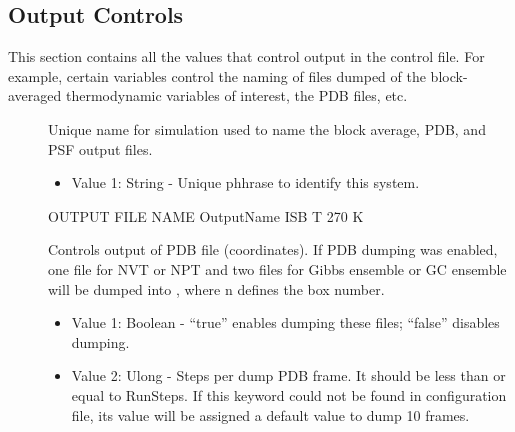 \documentclass[letterpaper,10pt,english]{sphinxmanual}
\begin{document}
\subsection{Output Controls}
\label{\detokenize{input_file:output-controls}}
This section contains all the values that control output in the control file. For example, certain variables control the naming of files dumped of the block-averaged thermodynamic variables of interest, the PDB files, etc.
\begin{description}
\item[{}] \leavevmode
Unique name for simulation used to name the block average, PDB, and PSF output files.
\begin{itemize}
\item {} 
Value 1: String - Unique phhrase to identify this system.

\end{itemize}

%
\begin{sphinxVerbatim}[commandchars=\\\{\}]
\PYGZsh{}\PYGZsh{}\PYGZsh{}\PYGZsh{}\PYGZsh{}\PYGZsh{}\PYGZsh{}\PYGZsh{}\PYGZsh{}\PYGZsh{}\PYGZsh{}\PYGZsh{}\PYGZsh{}\PYGZsh{}\PYGZsh{}\PYGZsh{}\PYGZsh{}\PYGZsh{}\PYGZsh{}\PYGZsh{}\PYGZsh{}\PYGZsh{}\PYGZsh{}\PYGZsh{}\PYGZsh{}\PYGZsh{}\PYGZsh{}\PYGZsh{}\PYGZsh{}\PYGZsh{}\PYGZsh{}\PYGZsh{}\PYGZsh{}
\PYGZsh{} OUTPUT FILE NAME
\PYGZsh{}\PYGZsh{}\PYGZsh{}\PYGZsh{}\PYGZsh{}\PYGZsh{}\PYGZsh{}\PYGZsh{}\PYGZsh{}\PYGZsh{}\PYGZsh{}\PYGZsh{}\PYGZsh{}\PYGZsh{}\PYGZsh{}\PYGZsh{}\PYGZsh{}\PYGZsh{}\PYGZsh{}\PYGZsh{}\PYGZsh{}\PYGZsh{}\PYGZsh{}\PYGZsh{}\PYGZsh{}\PYGZsh{}\PYGZsh{}\PYGZsh{}\PYGZsh{}\PYGZsh{}\PYGZsh{}\PYGZsh{}\PYGZsh{}
OutputName ISB T 270 K
\end{sphinxVerbatim}

\item[{}] \leavevmode
Controls output of PDB file (coordinates). If PDB dumping was enabled, one file for NVT or NPT and two files for Gibbs ensemble or GC ensemble will be dumped into , where n defines the box number.
\begin{itemize}
\item {} 
Value 1: Boolean - “true” enables dumping these files; “false” disables dumping.

\item {} 
Value 2: Ulong - Steps per dump PDB frame. It should be less than or equal to RunSteps. If this keyword could not be found in configuration file, its value will be assigned a default value to dump 10 frames.


\end{itemize}
\end{description}
\end{document}
